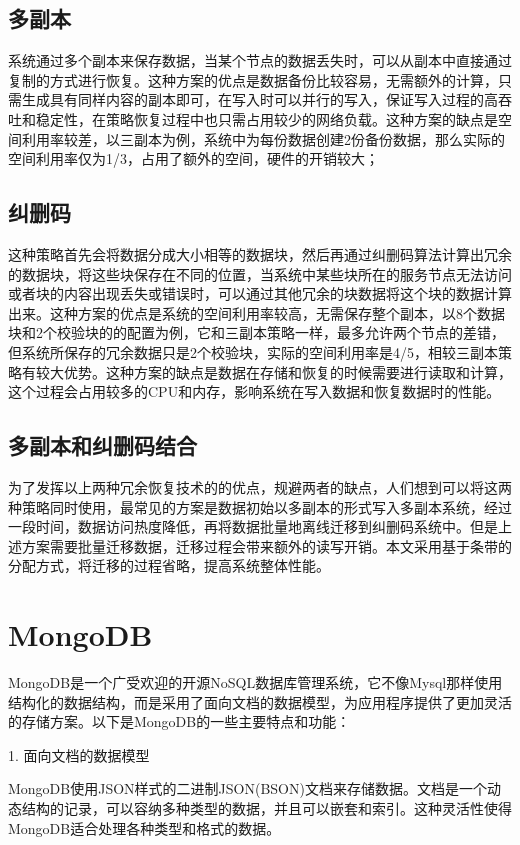 \subsection{多副本}%
系统通过多个副本来保存数据，当某个节点的数据丢失时，可以从副本中直接通过复制的方式进行恢复。这种方案的优点是数据备份比较容易，无需额外的计算，只需生成具有同样内容的副本即可，在写入时可以并行的写入，保证写入过程的高吞吐和稳定性，在策略恢复过程中也只需占用较少的网络负载。这种方案的缺点是空间利用率较差，以三副本为例，系统中为每份数据创建2份备份数据，那么实际的空间利用率仅为1/3，占用了额外的空间，硬件的开销较大；

\subsection{纠删码}%
这种策略首先会将数据分成大小相等的数据块，然后再通过纠删码算法计算出冗余的数据块，将这些块保存在不同的位置，当系统中某些块所在的服务节点无法访问或者块的内容出现丢失或错误时，可以通过其他冗余的块数据将这个块的数据计算出来。这种方案的优点是系统的空间利用率较高，无需保存整个副本，以8个数据块和2个校验块的的配置为例，它和三副本策略一样，最多允许两个节点的差错，但系统所保存的冗余数据只是2个校验块，实际的空间利用率是4/5，相较三副本策略有较大优势。这种方案的缺点是数据在存储和恢复的时候需要进行读取和计算，这个过程会占用较多的CPU和内存，影响系统在写入数据和恢复数据时的性能。

\subsection{多副本和纠删码结合}%
为了发挥以上两种冗余恢复技术的的优点，规避两者的缺点，人们想到可以将这两种策略同时使用，最常见的方案是数据初始以多副本的形式写入多副本系统，经过一段时间，数据访问热度降低，再将数据批量地离线迁移到纠删码系统中。但是上述方案需要批量迁移数据，迁移过程会带来额外的读写开销。本文采用基于条带的分配方式，将迁移的过程省略，提高系统整体性能。

\section{MongoDB}%
MongoDB是一个广受欢迎的开源NoSQL数据库管理系统，它不像Mysql那样使用结构化的数据结构，而是采用了面向文档的数据模型，为应用程序提供了更加灵活的存储方案。以下是MongoDB的一些主要特点和功能：

1. 面向文档的数据模型

MongoDB使用JSON样式的二进制JSON(BSON)文档来存储数据。文档是一个动态结构的记录，可以容纳多种类型的数据，并且可以嵌套和索引。这种灵活性使得MongoDB适合处理各种类型和格式的数据。

